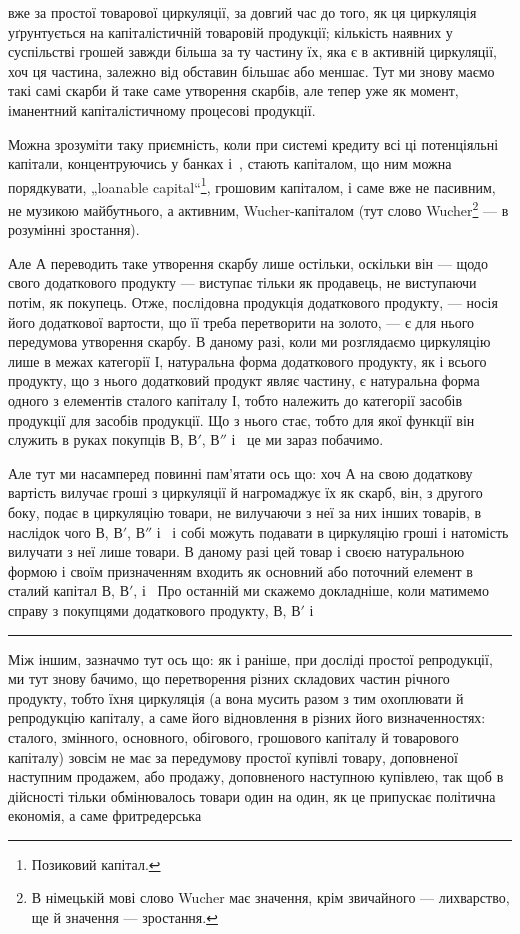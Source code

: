 \parcont{}  %
вже за простої товарової циркуляції, за довгий час до того, як ця циркуляція
уґрунтується на капіталістичній товаровій продукції; кількість
наявних у суспільстві грошей завжди більша за ту частину їх, яка є
в активній циркуляції, хоч ця частина, залежно від обставин більшає
або меншає. Тут ми знову маємо такі самі скарби й таке саме утворення
скарбів, але тепер уже як момент, іманентний капіталістичному процесові
продукції.

Можна зрозуміти таку приємність, коли при системі кредиту всі ці
потенціяльні капітали, концентруючись у банках і~, стають капіталом,
що ним можна порядкувати, „loanable capital“\footnote*{
Позиковий капітал. 
}, грошовим капіталом,
і саме вже не пасивним, не музикою майбутнього, а активним,
Wucher-капіталом (тут слово Wucher\footnote*{
В німецькій мові слово Wucher має значення, крім звичайного — лихварство,
ще й значення — зростання. 
} — в розумінні зростання).

Але $А$ переводить таке утворення скарбу лише остільки, оскільки він —
щодо свого додаткового продукту — виступає тільки як продавець, не виступаючи
потім, як покупець. Отже, послідовна продукція додаткового
продукту, — носія його додаткової вартости, що її треба перетворити
на золото, — є для нього передумова утворення скарбу. В даному разі,
коли ми розглядаємо циркуляцію лише в межах категорії І, натуральна
форма додаткового продукту, як і всього продукту, що з нього додатковий
продукт являє частину, є натуральна форма одного з елементів
сталого капіталу І, тобто належить до категорії засобів продукції для
засобів продукції. Що з нього стає, тобто для якої функції він служить
в руках покупців $В$, $В'$, $В''$ і~ це ми зараз побачимо.

Але тут ми насамперед повинні пам’ятати ось що: хоч $А$ на свою
додаткову вартість вилучає гроші з циркуляції й нагромаджує їх як
скарб, він, з другого боку, подає в циркуляцію товари, не вилучаючи
з неї за них інших товарів, в наслідок чого $В$, $В'$,  $В''$ і~ і собі
можуть подавати в циркуляцію гроші і натомість вилучати з неї лише
товари. В даному разі цей товар і своєю натуральною формою і своїм
призначенням входить як основний або поточний елемент в сталий капітал
$В$, $В'$, і~ Про останній ми скажемо докладніше, коли матимемо
справу з покупцями додаткового продукту, $В$, $В'$ і~

\pfbreak

Між іншим, зазначмо тут ось що: як і раніше, при досліді простої
репродукції, ми тут знову бачимо, що перетворення різних складових
частин річного продукту, тобто їхня циркуляція (а вона мусить разом
з тим охоплювати й репродукцію капіталу, а саме його відновлення
в різних його визначенностях: сталого, змінного, основного, обігового,
грошового капіталу й товарового капіталу) зовсім не має за передумову
простої купівлі товару, доповненої наступним продажем, або продажу,
доповненого наступною купівлею, так щоб в дійсності тільки обмінювалось
товари один на один, як це припускає політична економія, а саме фритредерська
\parbreak{}  %
